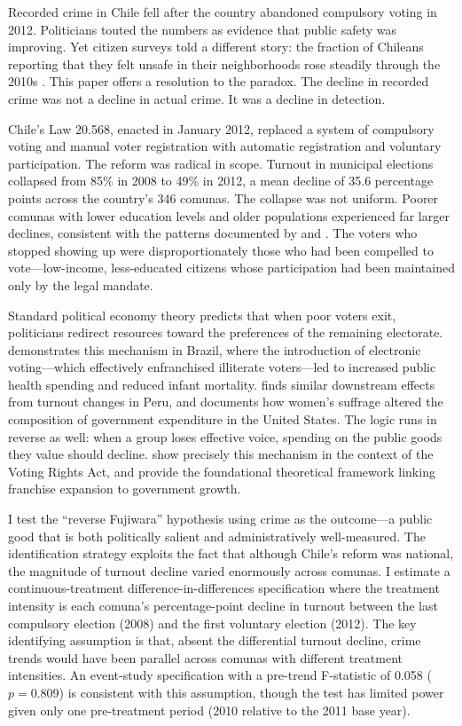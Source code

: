 \documentclass[12pt]{article}
\begin{document}
Recorded crime in Chile fell after the country abandoned compulsory voting in 2012. Politicians touted the numbers as evidence that public safety was improving. Yet citizen surveys told a different story: the fraction of Chileans reporting that they felt unsafe in their neighborhoods rose steadily through the 2010s \citep{McCollister2010}. This paper offers a resolution to the paradox. The decline in recorded crime was not a decline in actual crime. It was a decline in detection.

Chile's Law 20.568, enacted in January 2012, replaced a system of compulsory voting and manual voter registration with automatic registration and voluntary participation. The reform was radical in scope. Turnout in municipal elections collapsed from 85\% in 2008 to 49\% in 2012, a mean decline of 35.6 percentage points across the country's 346 comunas. The collapse was not uniform. Poorer comunas with lower education levels and older populations experienced far larger declines, consistent with the patterns documented by \citet{Cox2022} and \citet{Contreras2016}. The voters who stopped showing up were disproportionately those who had been compelled to vote---low-income, less-educated citizens whose participation had been maintained only by the legal mandate.

Standard political economy theory predicts that when poor voters exit, politicians redirect resources toward the preferences of the remaining electorate. \citet{Fujiwara2015} demonstrates this mechanism in Brazil, where the introduction of electronic voting---which effectively enfranchised illiterate voters---led to increased public health spending and reduced infant mortality. \citet{Leon2017} finds similar downstream effects from turnout changes in Peru, and \citet{Miller2008} documents how women's suffrage altered the composition of government expenditure in the United States. The logic runs in reverse as well: when a group loses effective voice, spending on the public goods they value should decline. \citet{Cascio2014} show precisely this mechanism in the context of the Voting Rights Act, and \citet{Husted1997} provide the foundational theoretical framework linking franchise expansion to government growth.

I test the ``reverse Fujiwara'' hypothesis using crime as the outcome---a public good that is both politically salient and administratively well-measured. The identification strategy exploits the fact that although Chile's reform was national, the magnitude of turnout decline varied enormously across comunas. I estimate a continuous-treatment difference-in-differences specification where the treatment intensity is each comuna's percentage-point decline in turnout between the last compulsory election (2008) and the first voluntary election (2012). The key identifying assumption is that, absent the differential turnout decline, crime trends would have been parallel across comunas with different treatment intensities. An event-study specification with a pre-trend F-statistic of 0.058 ($p = 0.809$) is consistent with this assumption, though the test has limited power given only one pre-treatment period (2010 relative to the 2011 base year).
\end{document}
